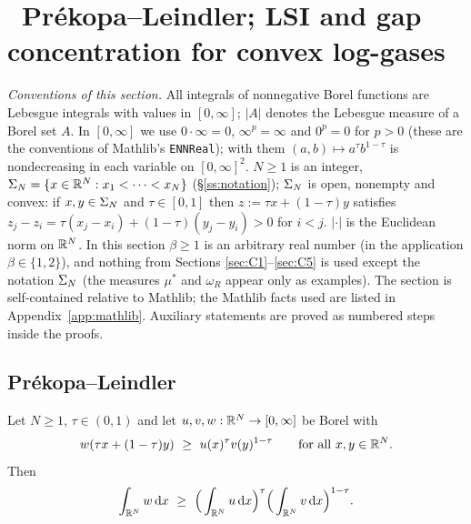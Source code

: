 \section{\INFRA\ Pr\'ekopa--Leindler; LSI and gap concentration for convex log-gases}\label{sec:C6}

\noindent\emph{Conventions of this section.}
All integrals of nonnegative Borel functions are Lebesgue integrals with values in $[0,\infty]$; $|A|$ denotes the Lebesgue measure of a Borel set $A$.
In $[0,\infty]$ we use $0\cdot\infty=0$, $\infty^p=\infty$ and $0^p=0$ for $p>0$ (these are the conventions of Mathlib's \texttt{ENNReal}); with them $(a,b)\mapsto a^\tau b^{1-\tau}$ is nondecreasing in each variable on $[0,\infty]^2$.
$N\ge1$ is an integer, $\Sigma_N=\{x\in\mathbb{R}^N:x_1<\dots<x_N\}$ (\S\ref{ss:notation}); $\Sigma_N$ is open, nonempty and convex: if $x,y\in\Sigma_N$ and $\tau\in[0,1]$ then $z:=\tau x+(1-\tau)y$ satisfies $z_j-z_i=\tau(x_j-x_i)+(1-\tau)(y_j-y_i)>0$ for $i<j$.
$|\cdot|$ is the Euclidean norm on $\mathbb{R}^N$.
In this section $\beta\ge1$ is an arbitrary real number (in the application $\beta\in\{1,2\}$), and nothing from Sections \ref{sec:C1}--\ref{sec:C5} is used except the notation $\Sigma_N$ (the measures $\mu^*$ and $\omega_R$ appear only as examples).
The section is self-contained relative to Mathlib; the Mathlib facts used are listed in Appendix~\ref{app:mathlib}.
Auxiliary statements are proved as numbered steps inside the proofs.

\subsection{Pr\'ekopa--Leindler}

\begin{theorem}\label{thm:PL}
Let $N\ge1$, $\tau\in(0,1)$ and let $u,v,w:\mathbb{R}^N\to[0,\infty]$ be Borel with
\begin{equation}\label{c6:PLhyp}
w(\tau x+(1-\tau)y)\ \ge\ u(x)^\tau v(y)^{1-\tau}\qquad\text{for all }x,y\in\mathbb{R}^N .
\end{equation}
Then
\begin{equation}\label{c6:PLconcl}
\int_{\mathbb{R}^N} w\,\mathrm{d} x\ \ge\ \Big(\int_{\mathbb{R}^N} u\,\mathrm{d} x\Big)^\tau\Big(\int_{\mathbb{R}^N} v\,\mathrm{d} x\Big)^{1-\tau}.
\end{equation}
\end{theorem}

